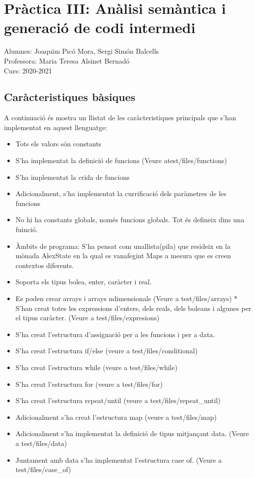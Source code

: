 \documentclass{article}
\begin{document}
\section{Pràctica III: Anàlisi semàntica i generació de codi intermedi}
Alumnes: Joaquim Picó Mora, Sergi Simón Balcells\\
Professora: Maria Teresa Alsinet Bernadó\\
Curs: 2020-2021
\subsection{Caràcteristiques bàsiques}
A continuació és mostra un llistat de les caràcteristiques principals
que s'han implementat en aquest llenguatge: 
\begin{itemize}
\item Tots els valors són constants 
\item S'ha implementat la definició de funcions (Veure atest/files/functions) 
\item S'ha implementat la crida de funcions 
\item Adicionalment, s'ha implementat la currificació dels paràmetres de les funcions 
\item No hi ha constants globals, només funcions globals. Tot és defineix dins una fuinció. 
\item Àmbits de programa: S'ha pensat com unallista(pila) que resideix en la mònada AlexState en la qual es vanafegint Maps a mesura que es creen contextos diferents. 
\item Soporta els tipus bolea, enter, caràcter i real. 
\item Es poden crear arrays i arrays ndimensionals (Veure a test/files/arrays) * S'han creat totes les expressions d'enters, dels reals, dels boleans i algunes per el tipus caràcter. (Veure a test/files/expresions) 
\item S'ha creat l'estructura d'assignació per a les funcions i per a data. 
\item S'ha creat l'estructura if/else (veure a test/files/conditional) 
\item S'ha creat l'estructura while (veure a test/files/while) 
\item S'ha creat l'estructura for (veure a test/files/for)
\item S'ha creat l'estructura repeat/until (veure a test/files/repeat\_until)
\item Adicionalment s'ha creat l'estructura map (veure a test/files/map)
\item Adicionalment s'ha implementat la definició de tipus mitjançant data. (Veure a test/files/data) 
\item Juntament amb data s'ha implementat l'estructura case of. (Veure a test/files/case\_of)
\end{itemize}
\end{document}
